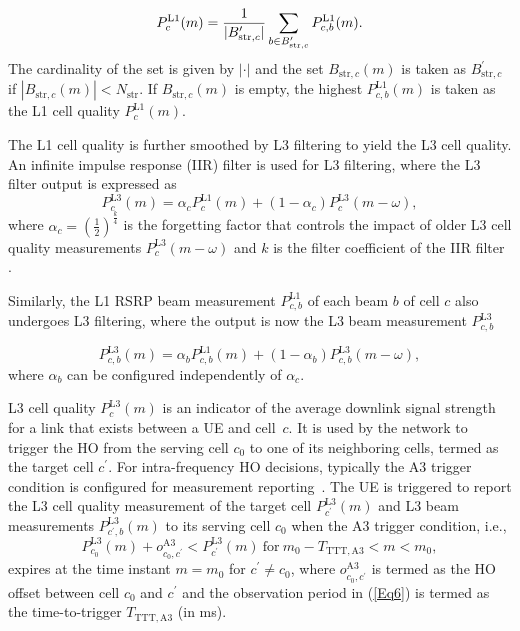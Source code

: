 \documentclass[10pt, conference]{IEEEtran}
\begin{document}
%
\begin{equation}
\vspace{-0.2\baselineskip}
\label{Eq3}
    P_{c}^\textrm{L1}(m) = \frac{1}{|B_{\mathrm{str},c}^{\prime}|} \sum_{b \in B_{\mathrm{str},c}^{\prime}}  P_{c,b}^\textrm{L1}(m).
\end{equation}
%
The cardinality of the set is given by $|\cdot|$ and the set $B_{\mathrm{str},c}(m)$ is taken as $B_{\mathrm{str},c}^{\prime}$ if $|B_{\mathrm{str},c}(m)| < N_\mathrm{str}$. If $B_{\mathrm{str},c}(m)$ is empty, the highest $P_{c,b}^\textrm{L1}(m)$ is taken as the L1 cell quality $P_{c}^\textrm{L1}(m)$.

The L1 cell quality is further smoothed by L3 filtering to yield the L3 cell quality. An infinite impulse response (IIR) filter is used for L3 filtering, where the L3 filter output is expressed as
%
\vspace{-0.2\baselineskip}
\begin{equation}
\label{Eq4}
    P_{c}^\textrm{L3}(m) = \alpha_c  P_{c}^\textrm{L1}(m) + (1-\alpha_c)P_{c}^\textrm{L3}(m-\omega),
\end{equation}
%
where $\alpha_c = (\frac{1}{2})^{\frac{k}{4}}$ is the forgetting factor that controls the impact of older L3 cell quality measurements $P_{c}^\textrm{L3}(m-\omega)$ and $k$ is the filter coefficient of the IIR filter \cite{b7}.

Similarly, the L1 RSRP beam measurement $P_{c,b}^\textrm{L1}$ of each beam $b$ of cell $c$ also undergoes L3 filtering, where the output is now the L3 beam measurement $P_{c,b}^\textrm{L3}$ 

%
\vspace{-0.6\baselineskip}
\begin{equation}
\label{Eq5}
    P_{c,b}^\textrm{L3}(m) = \alpha_b  P_{c,b}^\textrm{L1}(m) + (1-\alpha_b)P_{c,b}^\textrm{L3}(m-\omega),
\end{equation}
%
where $\alpha_b$ can be configured independently of $\alpha_c$.

L3 cell quality $P_{c}^\textrm{L3}(m)$ is an indicator of the average downlink signal strength for a link that exists between a UE and cell~$c$. It is used by the network to trigger the HO from the serving cell $c_0$ to one of its neighboring cells, termed as the target cell $c^{\prime}$. For intra-frequency HO decisions, typically the A3 trigger condition is configured for measurement reporting~\cite{b7}. The UE is triggered to report the L3 cell quality measurement of the target cell $P_{c^{\prime}}^\textrm{L3}(m)$ and L3 beam measurements $P_{c^{\prime},b}^\textrm{L3}(m)$ to its serving cell $c_0$ when the A3 trigger condition, i.e.,
%
\vspace{-0.2\baselineskip}
\begin{equation}
\label{Eq6}
     P_{c_0}^\textrm{L3}(m) + o^\mathrm{A3}_{c_0, c^{\prime}} < P_{c^{\prime}}^\textrm{L3}(m) \ \text{for} \  m_0 - T_\mathrm{TTT,A3} < m < m_0,
\end{equation}
%
expires at the time instant $m=m_0$ for $c^{\prime} \neq c_0$, where $o^\mathrm{A3}_{c_0, c^{\prime}}$ is termed as the HO offset between cell $c_0$ and $c^{\prime}$ and the observation period in (\ref{Eq6}) is termed as the time-to-trigger $T_\mathrm{TTT,A3}$ (in ms).
\end{document}

